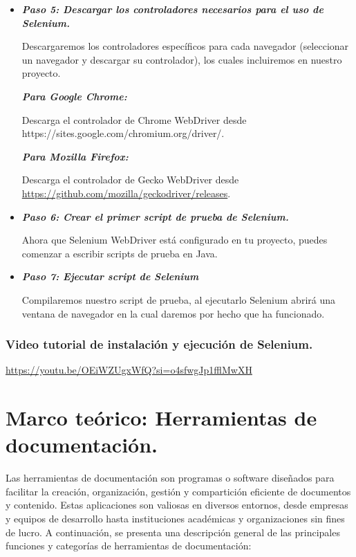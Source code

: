 \documentclass[letterpaper]{article}
\begin{document}
\begin{itemize}[series=listWWNumx,]
\item \textbf{\textit{Paso 5: Descargar los controladores necesarios para el uso de Selenium.}}

Descargaremos los controladores específicos para cada navegador (seleccionar un navegador y descargar su controlador),
los cuales incluiremos en nuestro proyecto.

\textbf{\textit{Para Google Chrome:}}

Descarga el controlador de Chrome WebDriver desde https://sites.google.com/chromium.org/driver/.

\textbf{\textit{Para Mozilla Firefox:}}

Descarga el controlador de Gecko WebDriver desde \url{https://github.com/mozilla/geckodriver/releases}.

\item \textbf{\textit{Paso 6: Crear el primer script de prueba de Selenium.}}

Ahora que Selenium WebDriver está configurado en tu proyecto, puedes comenzar a escribir scripts de prueba en Java.

\item \textbf{\textit{Paso 7: Ejecutar script de Selenium}}

Compilaremos nuestro script de prueba, al ejecutarlo Selenium abrirá una ventana de navegador en la cual daremos por
hecho que ha funcionado. 
\end{itemize}
\subsubsection{Video tutorial de instalación y ejecución de Selenium.}
\url{https://youtu.be/OEiWZUgxWfQ?si=o4sfwgJp1fflMwXH}

\section{Marco teórico: Herramientas de documentación.}
Las herramientas de documentación son programas o software diseñados para facilitar la creación, organización, gestión y
compartición eficiente de documentos y contenido. Estas aplicaciones son valiosas en diversos entornos, desde empresas
y equipos de desarrollo hasta instituciones académicas y organizaciones sin fines de lucro. A continuación, se presenta
una descripción general de las principales funciones y categorías de herramientas de documentación:
\end{document}
